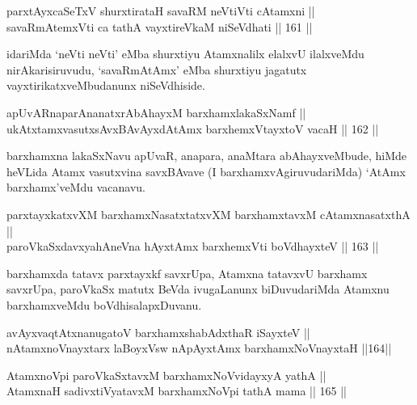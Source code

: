 \begin{shl}
parxtAyxcaSeTxV shurxtirataH savaRM neVtiVti cA\s \s tamxni || \\
savaRmAtemxVti ca tathA vayxtireVkaM niSeVdhati \hfill || 161 ||  
\end{shl}

\begin{artha}
idariMda `neVti neVti' eMba shurxtiyu Atamxnalilx elalxvU ilalxveMdu
nirAkarisiruvudu, `savaRmAtAmx' eMba shurxtiyu jagatutx
vayxtirikatxveMbudanunx niSeVdhiside.
\end{artha}

\begin{shl}
apUvARnaparAnanatxrAbAhayxM barxhamxlakaSxNamf || \\
ukAtxtamxvasutxsAvxBAvAyxdAtAmx barxhemxVtayxtoV vacaH \hfill || 162 ||  
\end{shl}

\begin{artha}
barxhamxna lakaSxNavu apUvaR, anapara, anaMtara abAhayxveMbude, hiMde
heVLida Atamx vasutxvina savxBAvave (I barxhamxvAgiruvudariMda) `AtAmx
barxhamx'veMdu vacanavu.
\end{artha}

\begin{shl}
parxtayxkatxvXM barxhamxNasatxtatxvXM barxhamxtavxM cA\s \s tamxnasatxthA || \\
paroVkaSxdavxyahAneVna hAyxtAmx barxhemxVti boVdhayxteV \hfill || 163 ||  
\end{shl}

\begin{artha}
barxhamxda tatavx parxtayxkf savxrUpa, Atamxna tatavxvU barxhamx
savxrUpa, paroVkaSx matutx BeVda ivugaLanunx biDuvudariMda Atamxnu
barxhamxveMdu boVdhisalapxDuvanu.
\end{artha}


\begin{shl}
avAyxvaqtAtxnanugatoV barxhamxshabAdxthaR iSayxteV ||  \\
nA\s \s tamxnoV\s nayxtarx laBoyxV\s sw nApAyxtAmx barxhamxNoV\s nayxtaH \hfill ||164||  
\end{shl}

\begin{shl}
AtamxnoV\s pi paroVkaSxtavxM barxhamxNoV\s vidayxyA yathA || \\
AtamxnaH sadivxtiVyatavxM barxhamxNoV\s pi tathA mama \hfill || 165 ||  
\end{shl}

